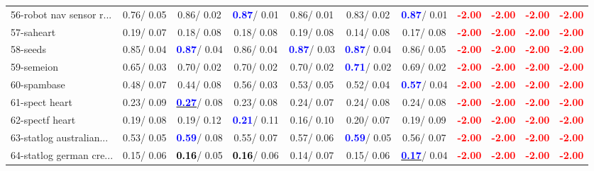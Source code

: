 \begin{table}[h]
\begin{center}
{\begin{tabular}{lc|c|c|c|c|c|c|c|c|c}
56-robot nav sensor r... &   0.76/  0.05 &   0.86/  0.02 & \textcolor{blue}{\textbf{  0.87}}/  0.01 &   0.86/  0.01 &   0.83/  0.02 & \textcolor{blue}{\textbf{  0.87}}/  0.01 & \textcolor{red}{\textbf{ -2.00}} & \textcolor{red}{\textbf{ -2.00}} & \textcolor{red}{\textbf{ -2.00}} & \textcolor{red}{\textbf{ -2.00}} \\
57-saheart &   0.19/  0.07 &   0.18/  0.08 &   0.18/  0.08 &   0.19/  0.08 &   0.14/  0.08 &   0.17/  0.08 & \textcolor{red}{\textbf{ -2.00}} & \textcolor{red}{\textbf{ -2.00}} & \textcolor{red}{\textbf{ -2.00}} & \textcolor{red}{\textbf{ -2.00}} \\
58-seeds &   0.85/  0.04 & \textcolor{blue}{\textbf{  0.87}}/  0.04 &   0.86/  0.04 & \textcolor{blue}{\textbf{  0.87}}/  0.03 & \textcolor{blue}{\textbf{  0.87}}/  0.04 &   0.86/  0.05 & \textcolor{red}{\textbf{ -2.00}} & \textcolor{red}{\textbf{ -2.00}} & \textcolor{red}{\textbf{ -2.00}} & \textcolor{red}{\textbf{ -2.00}} \\
59-semeion &   0.65/  0.03 &   0.70/  0.02 &   0.70/  0.02 &   0.70/  0.02 & \textcolor{blue}{\textbf{  0.71}}/  0.02 &   0.69/  0.02 & \textcolor{red}{\textbf{ -2.00}} & \textcolor{red}{\textbf{ -2.00}} & \textcolor{red}{\textbf{ -2.00}} & \textcolor{red}{\textbf{ -2.00}} \\
60-spambase &   0.48/  0.07 &   0.44/  0.08 &   0.56/  0.03 &   0.53/  0.05 &   0.52/  0.04 & \textcolor{blue}{\textbf{  0.57}}/  0.04 & \textcolor{red}{\textbf{ -2.00}} & \textcolor{red}{\textbf{ -2.00}} & \textcolor{red}{\textbf{ -2.00}} & \textcolor{red}{\textbf{ -2.00}} \\ \hline
61-spect heart &   0.23/  0.09 & \underline{\textcolor{blue}{\textbf{  0.27}}}/  0.08 &   0.23/  0.08 &   0.24/  0.07 &   0.24/  0.08 &   0.24/  0.08 & \textcolor{red}{\textbf{ -2.00}} & \textcolor{red}{\textbf{ -2.00}} & \textcolor{red}{\textbf{ -2.00}} & \textcolor{red}{\textbf{ -2.00}} \\
62-spectf heart &   0.19/  0.08 &   0.19/  0.12 & \textcolor{blue}{\textbf{  0.21}}/  0.11 &   0.16/  0.10 &   0.20/  0.07 &   0.19/  0.09 & \textcolor{red}{\textbf{ -2.00}} & \textcolor{red}{\textbf{ -2.00}} & \textcolor{red}{\textbf{ -2.00}} & \textcolor{red}{\textbf{ -2.00}} \\
63-statlog australian... &   0.53/  0.05 & \textcolor{blue}{\textbf{  0.59}}/  0.08 &   0.55/  0.07 &   0.57/  0.06 & \textcolor{blue}{\textbf{  0.59}}/  0.05 &   0.56/  0.07 & \textcolor{red}{\textbf{ -2.00}} & \textcolor{red}{\textbf{ -2.00}} & \textcolor{red}{\textbf{ -2.00}} & \textcolor{red}{\textbf{ -2.00}} \\
64-statlog german cre... &   0.15/  0.06 & \textcolor{black}{\textbf{  0.16}}/  0.05 & \textcolor{black}{\textbf{  0.16}}/  0.06 &   0.14/  0.07 &   0.15/  0.06 & \underline{\textcolor{blue}{\textbf{  0.17}}}/  0.04 & \textcolor{red}{\textbf{ -2.00}} & \textcolor{red}{\textbf{ -2.00}} & \textcolor{red}{\textbf{ -2.00}} & \textcolor{red}{\textbf{ -2.00}} \\\end{tabular}}\label{stratsALCKappa1b5NNaRedux}
\end{center}
\end{table}
